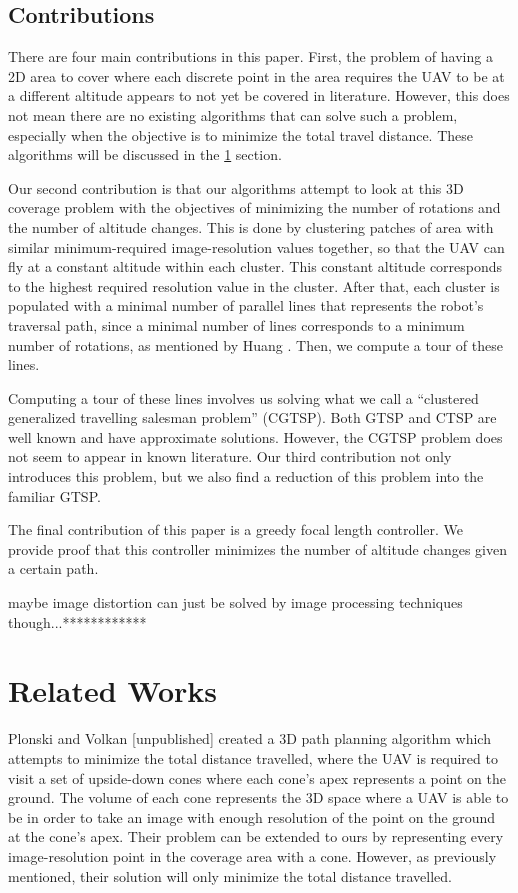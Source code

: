 \documentclass[conference]{IEEEtran}
\theoremstyle{plain}%
\begin{document}
\subsection{Contributions}
There are four main contributions in this paper. First, the problem of having a 2D area to cover where each discrete point in the area requires the UAV to be at a different altitude appears to not yet be covered in literature. However, this does not mean there are no existing algorithms that can solve such a problem, especially when the objective is to minimize the total travel distance. These algorithms will be discussed in the \ref{Related Works} section.

Our second contribution is that our algorithms attempt to look at this 3D coverage problem with the objectives of minimizing the number of rotations and the number of altitude changes. This is done by clustering patches of area with similar minimum-required image-resolution values together, so that the UAV can fly at a constant altitude within each cluster. This constant altitude corresponds to the highest required resolution value in the cluster. After that, each cluster is populated with a minimal number of parallel lines that represents the robot's traversal path, since a minimal number of lines corresponds to a minimum number of rotations, as mentioned by Huang \cite{huang2001optimal}. Then, we compute a tour of these lines.

Computing a tour of these lines involves us solving what we call a ``clustered generalized travelling salesman problem'' (CGTSP). Both GTSP and CTSP are well known and have approximate solutions. However, the CGTSP problem does not seem to appear in known literature. Our third contribution not only introduces this problem, but we also find a reduction of this problem into the familiar GTSP.

The final contribution of this paper is a greedy focal length controller. We provide proof that this controller minimizes the number of altitude changes given a certain path.

\-maybe image distortion can just be solved by image processing techniques though...************

\section{Related Works} \label{Related Works}
Plonski and Volkan {\color{red}[unpublished]} created a 3D path planning algorithm which attempts to minimize the total distance travelled, where the UAV is required to visit a set of upside-down cones where each cone's apex represents a point on the ground. The volume of each cone represents the 3D space where a UAV is able to be in order to take an image with enough resolution of the point on the ground at the cone's apex. Their problem can be extended to ours by representing every image-resolution point in the coverage area with a cone. However, as previously mentioned, their solution will only minimize the total distance travelled.
\end{document}
